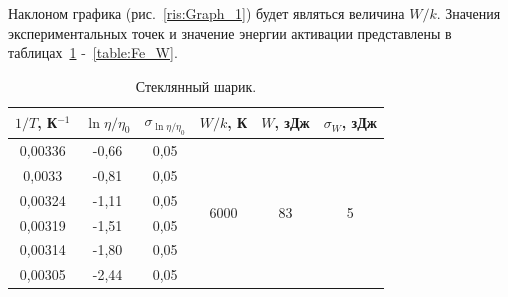 \documentclass[a4paper,12pt]{article} %
\begin{document}
	Наклоном графика (рис.~\ref{ris:Graph_1}) будет являться величина $W/k$. Значения экспериментальных точек и значение энергии активации представлены в таблицах~\ref{table:glass_W} -~\ref{table:Fe_W}.
	
	\begin{table}[H]
		\caption{Стеклянный шарик.}
		\label{table:glass_W}
\begin{tabular}{|c|c|c|c|c|c|}
\hline
$1/T$, К$^{-1}$ & $\ln{\eta/\eta_0}$ & $\sigma_{\ln{\eta/\eta_0}}$ & $W/k$, К              & $W$, зДж            & $\sigma_W$, зДж    \\ \hline
0,00336         & -0,66              & 0,05                        & \multirow{6}{*}{6000} & \multirow{6}{*}{83} & \multirow{6}{*}{5} \\ \cline{1-3}
0,0033          & -0,81              & 0,05                        &                       &                     &                    \\ \cline{1-3}
0,00324         & -1,11              & 0,05                        &                       &                     &                    \\ \cline{1-3}
0,00319         & -1,51              & 0,05                        &                       &                     &                    \\ \cline{1-3}
0,00314         & -1,80              & 0,05                        &                       &                     &                    \\ \cline{1-3}
0,00305         & -2,44              & 0,05                        &                       &                     &                    \\ \hline
\end{tabular}
	\end{table}	
	
\end{document}
